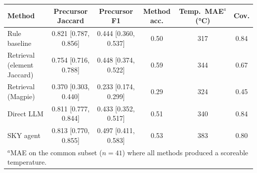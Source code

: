 \begin{tabular}{lccccc}
\toprule
Method & Precursor Jaccard & Precursor F1 & Method acc. & Temp.\ MAE$^{a}$ (\si{\celsius}) & Cov. \\
\midrule
Rule baseline & 0.821 [0.787, 0.856] & 0.444 [0.360, 0.537] & 0.50 & 317 & 0.84 \\
Retrieval (element Jaccard) & 0.754 [0.716, 0.788] & 0.448 [0.374, 0.522] & 0.59 & 344 & 0.67 \\
Retrieval (Magpie) & 0.370 [0.303, 0.440] & 0.233 [0.174, 0.299] & 0.29 & 324 & 0.45 \\
Direct LLM & 0.811 [0.777, 0.844] & 0.433 [0.352, 0.517] & 0.51 & 340 & 0.84 \\
SKY agent & 0.813 [0.770, 0.855] & 0.497 [0.411, 0.583] & 0.53 & 383 & 0.80 \\
\bottomrule
\multicolumn{6}{l}{\footnotesize $^a$MAE on the common subset ($n=41$) where all methods produced a scoreable temperature.}
\end{tabular}
